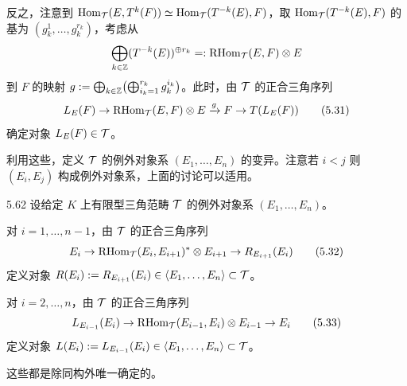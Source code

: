 
反之，注意到 $\operatorname{Hom}_{\mathcal{T}}(E,T^{k}(F)) \simeq \operatorname{Hom}_{\mathcal{T}}(T^{-k}(E),F)$，取 $\operatorname{Hom}_{\mathcal{T}}(T^{-k}(E),F)$ 的基为 $(g^{1}_{k},\ldots,g^{r_{k}}_{k})$，考虑从
\[
  \bigoplus_{k\in\mathbb{Z}}(T^{-k}(E))^{\oplus r_{k}} =: \operatorname{RHom}_{\mathcal{T}}(E,F)\otimes E
\]
到 $F$ 的映射 $g := \bigoplus_{k\in\mathbb{Z}}\bigl(\bigoplus_{i_{k}=1}^{r_{k}}g^{i_{k}}_{k}\bigr)$。此时，由 $\mathcal{T}$ 的正合三角序列
\begin{equation}
  L_{E}(F) \to \operatorname{RHom}_{\mathcal{T}}(E,F)\otimes E \xrightarrow{g} F \to T(L_{E}(F)) \tag{5.31}
\end{equation}
确定对象 $L_{E}(F) \in \mathcal{T}$。

利用这些，定义 $\mathcal{T}$ 的例外对象系 $(E_{1},\ldots,E_{n})$ 的变异。注意若 $i < j$ 则 $(E_{i},E_{j})$ 构成例外对象系，上面的讨论可以适用。

\begin{definition}{5.62} 设给定 $K$ 上有限型三角范畴 $\mathcal{T}$ 的例外对象系 $(E_{1},\ldots,E_{n})$。

对 $i = 1,\ldots,n-1$，由 $\mathcal{T}$ 的正合三角序列
\begin{equation}
  E_{i} \to \operatorname{RHom}_{\mathcal{T}}(E_{i},E_{i+1})^{*}\otimes E_{i+1} \to R_{E_{i+1}}(E_{i}) \tag{5.32}
\end{equation}
定义对象 $R(E_{i}) := R_{E_{i+1}}(E_{i}) \in \langle E_{1},\ldots,E_{n}\rangle \subset \mathcal{T}$。

对 $i = 2,\ldots,n$，由 $\mathcal{T}$ 的正合三角序列
\begin{equation}
  L_{E_{i-1}}(E_{i}) \to \operatorname{RHom}_{\mathcal{T}}(E_{i-1},E_{i})\otimes E_{i-1} \to E_{i} \tag{5.33}
\end{equation}
定义对象 $L(E_{i}) := L_{E_{i-1}}(E_{i}) \in \langle E_{1},\ldots,E_{n}\rangle \subset \mathcal{T}$。

这些都是除同构外唯一确定的。\end{definition}


